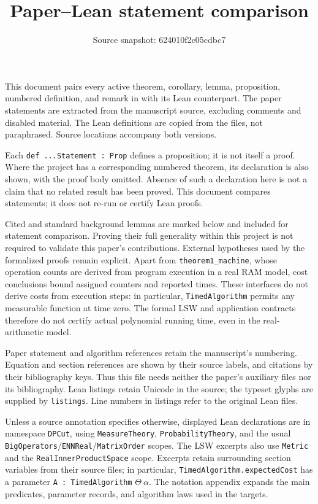 \documentclass[a4paper,10pt]{article}
\title{Paper--Lean statement comparison}
\author{}
\date{Source snapshot: 624010f2c05cdbc7}
\theoremstyle{definition}
\theoremstyle{remark}
\newcommand{\SourceId}[1]{\texttt{\detokenize{#1}}}
\begin{document}
\maketitle
This document pairs every active theorem, corollary, lemma, proposition,
numbered definition, and remark in \SourceId{STOC2027.tex} with its Lean counterpart.
The paper statements are extracted from the manuscript source, excluding
comments and disabled material. The Lean definitions are copied from the
\SourceId{DPCut/} files, not paraphrased. Source locations accompany both versions.

Each \texttt{def ...Statement : Prop} defines a proposition; it is not itself a
proof. Where the project has a corresponding numbered theorem, its declaration
is also shown, with the proof body omitted. Absence of such a declaration here
is not a claim that no related result has been proved. This document compares
statements; it does not re-run or certify Lean proofs.

Cited and standard background lemmas are marked below and included for statement
comparison. Proving their full generality within this project is not required
to validate this paper's contributions. External hypotheses used by the
formalized proofs remain explicit. Apart from \texttt{theorem1\_machine}, whose
operation counts are derived from program execution in a real RAM model, cost
conclusions bound assigned counters and reported times. These interfaces do not
derive costs from execution steps: in particular, \texttt{TimedAlgorithm} permits
any measurable function at time zero. The formal LSW and application contracts therefore do not certify actual
polynomial running time, even in the real-arithmetic model.

Paper statement and algorithm references retain the manuscript's numbering.
Equation and section references are shown by their source labels, and citations
by their bibliography keys. Thus this file needs neither the paper's auxiliary
files nor its bibliography. Lean listings retain Unicode in the source; the
typeset glyphs are supplied by \texttt{listings}. Line numbers in listings refer
to the original Lean files.

Unless a source annotation specifies otherwise, displayed Lean declarations
are in namespace \texttt{DPCut}, using
\texttt{MeasureTheory}, \texttt{ProbabilityTheory}, and the usual
\texttt{BigOperators}/\texttt{ENNReal}/\texttt{MatrixOrder} scopes.
The LSW excerpts also use \texttt{Metric} and the \texttt{RealInnerProductSpace}
scope. Excerpts retain surrounding section variables from their source files;
in particular, \texttt{TimedAlgorithm.expectedCost} has a parameter
\texttt{A : TimedAlgorithm} $\Theta\ \alpha$.
The notation appendix expands the main predicates, parameter records, and
algorithm laws used in the targets.
\tableofcontents
\end{document}
